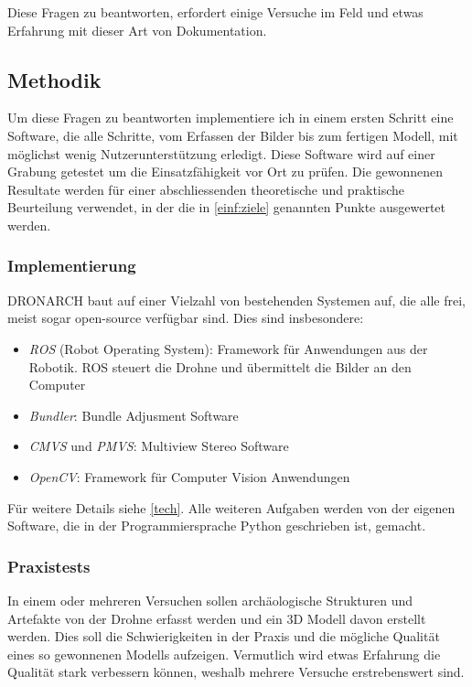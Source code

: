 \documentclass{paper}
\begin{document}
				Diese Fragen zu beantworten, erfordert einige Versuche im Feld und etwas Erfahrung mit dieser Art von Dokumentation.
				
		\subsection{Methodik}
			Um diese Fragen zu beantworten implementiere ich in einem ersten Schritt eine Software, die alle Schritte, vom Erfassen der Bilder bis zum fertigen Modell, mit möglichst wenig Nutzerunterstützung erledigt.			
			Diese Software wird auf einer Grabung getestet um die Einsatzfähigkeit vor Ort zu prüfen.
			Die gewonnenen Resultate werden für einer abschliessenden theoretische und praktische Beurteilung verwendet, in der die in \autoref{einf:ziele} genannten Punkte ausgewertet werden. 
			
			\subsubsection{Implementierung}
				DRONARCH baut auf einer Vielzahl von bestehenden Systemen auf, die alle frei, meist sogar open-source verfügbar sind.
				Dies sind insbesondere:
				\begin{itemize}
					\item
					 	\emph{ROS} (Robot Operating System): Framework für Anwendungen aus der Robotik. ROS steuert die Drohne und übermittelt die Bilder an den Computer
					\item
						\emph{Bundler}: Bundle Adjusment Software
					\item
						\emph{CMVS} und \emph{PMVS}: Multiview Stereo Software
					\item
						\emph{OpenCV}: Framework für Computer Vision Anwendungen
				\end{itemize}
				Für weitere Details siehe \autoref{tech}.
				Alle weiteren Aufgaben werden von der eigenen Software, die in der Programmiersprache Python geschrieben ist, gemacht.
			
			\subsubsection{Praxistests}
				In einem oder mehreren Versuchen sollen archäologische Strukturen und Artefakte von der Drohne erfasst werden und ein 3D Modell davon erstellt werden.
				Dies soll die Schwierigkeiten in der Praxis und die mögliche Qualität eines so gewonnenen Modells aufzeigen.
				Vermutlich wird etwas Erfahrung die Qualität stark verbessern können, weshalb mehrere Versuche erstrebenswert sind.
			
\end{document}
